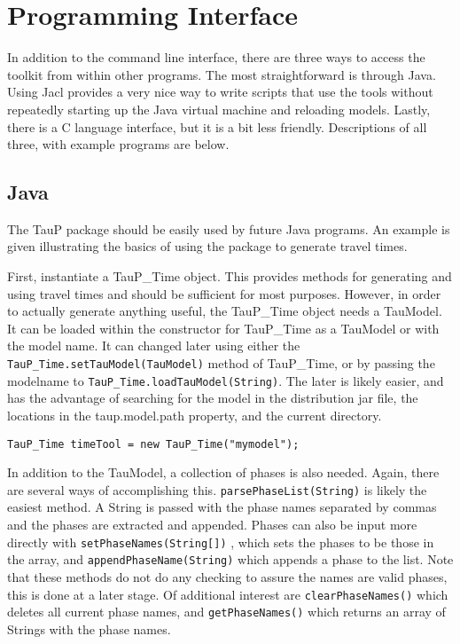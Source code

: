 
\section{Programming Interface}

In addition to the command line interface, there are three ways to access
the toolkit from within other programs. The most straightforward is 
through Java. Using Jacl provides a very nice way to write scripts that
use the tools without repeatedly starting up the Java virtual machine and
reloading models. Lastly, there is a C language interface, but it is 
a bit less friendly. Descriptions of all three, with example programs
are below.

\subsection{Java}

The TauP package should be easily used by future Java programs. An 
example is given illustrating the basics of using the package to 
generate travel times.

First, instantiate a TauP\_Time object. This provides methods for 
generating and 
using travel times and should be sufficient for most purposes.
However, in order to actually generate anything useful, the TauP\_Time 
object needs a TauModel. It can be loaded within the constructor for TauP\_Time
as a TauModel or with the model name.
It can changed later using either the \texttt{TauP\_Time.setTauModel(TauModel)} method of 
TauP\_Time, or by passing the modelname to \texttt{TauP\_Time.loadTauModel(String)}. 
The later is likely easier, and has the advantage of searching for the model in 
the distribution jar file, the locations in the taup.model.path property, 
and the current directory.

\texttt{TauP\_Time timeTool = new TauP\_Time("mymodel");}

In addition to the TauModel, a collection of phases is also needed. Again, 
there are several ways of accomplishing this. 
\texttt{parsePhaseList(String)} is likely the easiest method. A String is passed
with the phase names separated by commas and the phases are extracted and
appended. Phases can also be input more
directly with \texttt{setPhaseNames(String[])} ,
which sets the phases to be those in the array, and 
\texttt{appendPhaseName(String)} which appends a phase to the list. Note that 
these methods do not do any checking to assure the names are valid phases, 
this is done at a later stage. Of additional interest are 
\texttt{clearPhaseNames()} which deletes all current phase names, and 
\texttt{getPhaseNames()} which returns an array of Strings with the phase names.

